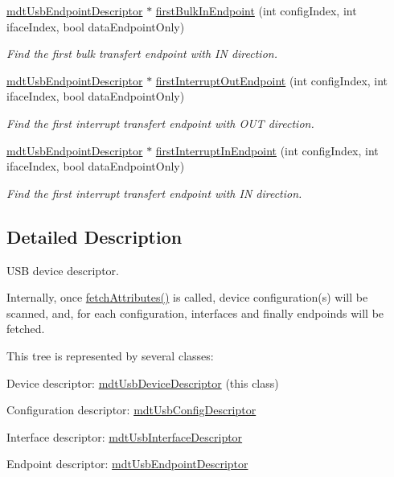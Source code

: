 \begin{DoxyCompactItemize}
\hyperlink{classmdt_usb_endpoint_descriptor}{mdt\-Usb\-Endpoint\-Descriptor} $\ast$ \hyperlink{classmdt_usb_device_descriptor_a078b5d3dfe6fd56ab2f716357a160585}{first\-Bulk\-In\-Endpoint} (int config\-Index, int iface\-Index, bool data\-Endpoint\-Only)
\begin{DoxyCompactList}\small\item\em Find the first bulk transfert endpoint with I\-N direction. \end{DoxyCompactList}\item 
\hyperlink{classmdt_usb_endpoint_descriptor}{mdt\-Usb\-Endpoint\-Descriptor} $\ast$ \hyperlink{classmdt_usb_device_descriptor_ad30b3579b0c77585df29acdfdf0fc179}{first\-Interrupt\-Out\-Endpoint} (int config\-Index, int iface\-Index, bool data\-Endpoint\-Only)
\begin{DoxyCompactList}\small\item\em Find the first interrupt transfert endpoint with O\-U\-T direction. \end{DoxyCompactList}\item 
\hyperlink{classmdt_usb_endpoint_descriptor}{mdt\-Usb\-Endpoint\-Descriptor} $\ast$ \hyperlink{classmdt_usb_device_descriptor_a95112e151605bf8b10c5eca74faaea3b}{first\-Interrupt\-In\-Endpoint} (int config\-Index, int iface\-Index, bool data\-Endpoint\-Only)
\begin{DoxyCompactList}\small\item\em Find the first interrupt transfert endpoint with I\-N direction. \end{DoxyCompactList}\end{DoxyCompactItemize}


\subsection{Detailed Description}
U\-S\-B device descriptor. 

Internally, once \hyperlink{classmdt_usb_device_descriptor_a6239e5e56e2e25a686cac98b18158500}{fetch\-Attributes()} is called, device configuration(s) will be scanned, and, for each configuration, interfaces and finally endpoinds will be fetched.

This tree is represented by several classes\-:
\begin{DoxyItemize}
\item Device descriptor\-: \hyperlink{classmdt_usb_device_descriptor}{mdt\-Usb\-Device\-Descriptor} (this class)
\item Configuration descriptor\-: \hyperlink{classmdt_usb_config_descriptor}{mdt\-Usb\-Config\-Descriptor}
\item Interface descriptor\-: \hyperlink{classmdt_usb_interface_descriptor}{mdt\-Usb\-Interface\-Descriptor}
\item Endpoint descriptor\-: \hyperlink{classmdt_usb_endpoint_descriptor}{mdt\-Usb\-Endpoint\-Descriptor}
\end{DoxyItemize}

